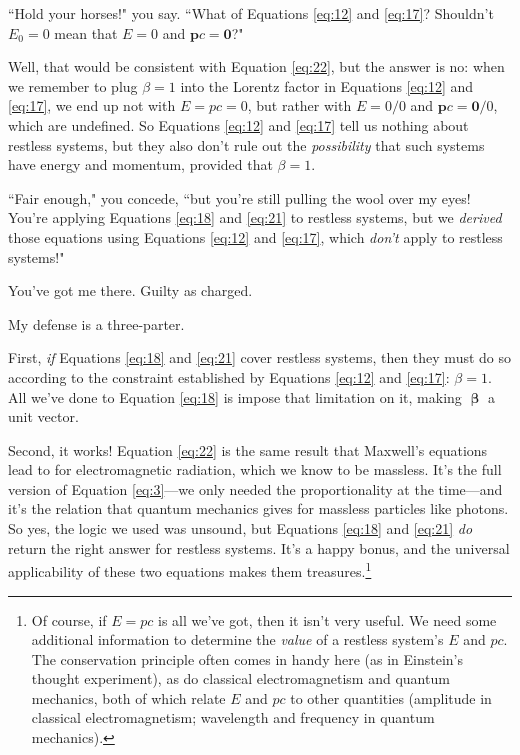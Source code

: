 \documentclass[12pt]{article}
\renewcommand{\vv}[1]{\mathbf{#1}}
\newcommand{\vvbeta}{\bm{\upbeta}}
\begin{document}
``Hold your horses!" you say. ``What of Equations \ref{eq:12} and \ref{eq:17}? Shouldn't $E_0 = 0$ mean that $E = 0$ and $\vv p c = \vv 0$?"

Well, that would be consistent with Equation \ref{eq:22}, but the answer is no: when we remember to plug $\beta = 1$ into the Lorentz factor in Equations \ref{eq:12} and \ref{eq:17}, we end up not with $E = p c = 0$, but rather with $E = 0/0$ and $\vv p c = \vv 0 / 0$, which are undefined. So Equations \ref{eq:12} and \ref{eq:17} tell us nothing about restless systems, but they also don't rule out the \emph{possibility} that such systems have energy and momentum, provided that $\beta = 1$.

``Fair enough," you concede, ``but you're still pulling the wool over my eyes! You're applying Equations \ref{eq:18} and \ref{eq:21} to restless systems, but we \emph{derived} those equations using Equations \ref{eq:12} and \ref{eq:17}, which \emph{don't} apply to restless systems!"

You've got me there. Guilty as charged.

My defense is a three-parter.

First, \emph{if} Equations \ref{eq:18} and \ref{eq:21} cover restless systems, then they must do so according to the constraint established by Equations \ref{eq:12} and \ref{eq:17}: $\beta = 1$. All we've done to Equation \ref{eq:18} is impose that limitation on it, making $\vvbeta$ a unit vector.

Second, it works! Equation \ref{eq:22} is the same result that Maxwell's equations lead to for electromagnetic radiation, which we know to be massless. It's the full version of Equation \ref{eq:3}---we only needed the proportionality at the time---and it's the relation that quantum mechanics gives for massless particles like photons. So yes, the logic we used was unsound, but Equations \ref{eq:18} and \ref{eq:21} \emph{do} return the right answer for restless systems. It's a happy bonus, and the universal applicability of these two equations makes them treasures.\footnote{Of course, if $E = p c$ is all we've got, then it isn't very useful. We need some additional information to determine the \emph{value} of a restless system's $E$ and $p c$. The conservation principle often comes in handy here (as in Einstein's thought experiment), as do classical electromagnetism and quantum mechanics, both of which relate $E$ and $p c$ to other quantities (amplitude in classical electromagnetism; wavelength and frequency in quantum mechanics).}
\end{document}
